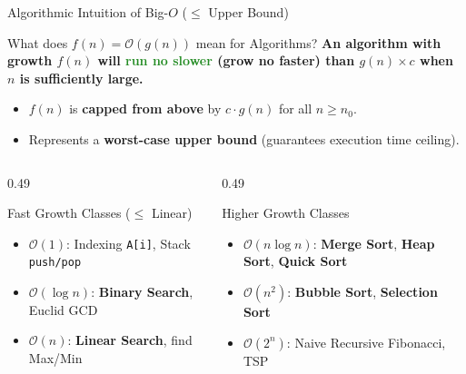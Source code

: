 \documentclass[aspectratio=169]{beamer}
\begin{document}
\begin{frame}{Algorithmic Intuition of Big-$O$ ($\le$ Upper Bound)}
  \begin{alertblock}{What does $f(n) = \mathcal{O}(g(n))$ mean for Algorithms?}
    \small
    \textbf{An algorithm with growth $f(n)$ will \textcolor{ForestGreen}{run no slower} (grow no faster) than $g(n) \times c$ when $n$ is sufficiently large.}
    \begin{itemize}
      \item $f(n)$ is \textbf{capped from above} by $c \cdot g(n)$ for all $n \ge n_0$.
      \item Represents a \textbf{worst-case upper bound} (guarantees execution time ceiling).
    \end{itemize}
  \end{alertblock}
  \vspace{0.2em}
  \begin{columns}[T]
    \begin{column}{0.49\textwidth}
      \begin{block}{Fast Growth Classes ($\le$ Linear)}
        \scriptsize
        \begin{itemize}\setlength{\itemsep}{0.2em}
          \item $\mathcal{O}(1)$: Indexing \texttt{A[i]}, Stack \texttt{push/pop}
          \item $\mathcal{O}(\log n)$: \textbf{Binary Search}, Euclid GCD
          \item $\mathcal{O}(n)$: \textbf{Linear Search}, find Max/Min
        \end{itemize}
      \end{block}
    \end{column}
    \begin{column}{0.49\textwidth}
      \begin{block}{Higher Growth Classes}
        \scriptsize
        \begin{itemize}\setlength{\itemsep}{0.2em}
          \item $\mathcal{O}(n\log n)$: \textbf{Merge Sort}, \textbf{Heap Sort}, \textbf{Quick Sort}
          \item $\mathcal{O}(n^2)$: \textbf{Bubble Sort}, \textbf{Selection Sort}
          \item $\mathcal{O}(2^n)$: Naive Recursive Fibonacci, TSP
        \end{itemize}
      \end{block}
    \end{column}
  \end{columns}
\end{frame}
\end{document}

